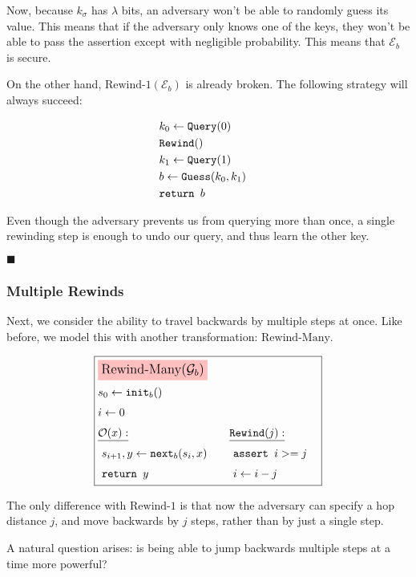 Now, because $k_\sigma$ has $\lambda$ bits, an adversary won't be able
to randomly guess its value.
This means that if the adversary only knows one of the keys, they won't
be able to pass the assertion except with negligible probability.
This means that $\mathcal{E}_b$ is secure.

On the other hand, $\text{Rewind-1}(\mathcal{E}_b)$ is already broken.
The following strategy will always succeed:

$$
\begin{aligned}
&k_0 \gets \texttt{Query}(0)\cr
&\texttt{Rewind}()\cr
&k_1 \gets \texttt{Query}(1)\cr
&b \gets \texttt{Guess}(k_0, k_1)\cr
&\texttt{return } b\cr
\end{aligned}
$$

Even though the adversary prevents us from querying more than once,
a single rewinding step is enough to undo our query, and thus learn
the other key.

$\blacksquare$

\subsubsection{Multiple Rewinds}

Next, we consider the ability to travel backwards by multiple steps
at once.
Like before, we model this with another transformation:
$\text{Rewind-Many}$.

\begin{game}
\captionsetup{justification=centering}
$$
\boxed{
\begin{aligned}
&\colorbox{pink}{\large $\text{Rewind-Many}(\mathcal{G}_b)$}\cr
&s_0 \gets \texttt{init}_b()\cr
&i \gets 0\cr
&\begin{aligned}
    &\underline{\mathcal{O}(x):}\cr
    &\ s_{i + 1}, y \gets \texttt{next}_b(s_i, x)\cr
    &\ \texttt{return } y\cr
\end{aligned}
&\begin{aligned}
    &\underline{\texttt{Rewind}(j):}\cr
    &\ \texttt{assert } i >= j\cr
    &\ i \gets i - j\cr
\end{aligned}\cr
\end{aligned}
}
$$
\caption{$\text{Rewind-Many}(\mathcal{G}_b)$}
\end{game}

The only difference with $\text{Rewind-1}$ is that now the adversary
can specify a hop distance $j$, and move backwards by $j$ steps,
rather than by just a single step.

A natural question arises: is being able to jump backwards multiple
steps at a time more powerful?

